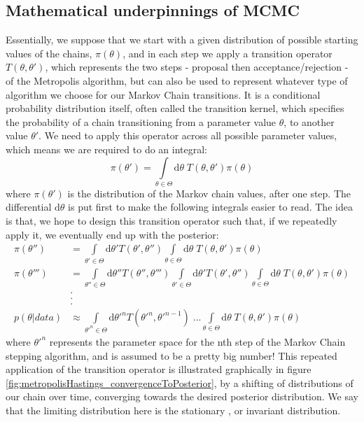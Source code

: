 \documentclass[11pt,fullpage]{book}
\begin{document}
\subsection{Mathematical underpinnings of MCMC}\label{sec:metropolisHastings_mathematicalMCMC}
Essentially, we suppose that we start with a given distribution of possible starting values of the chains, $\pi(\theta)$, and in each step we apply a transition operator $T(\theta,\theta')$, which represents the two steps - proposal then acceptance/rejection - of the Metropolis algorithm, but can also be used to represent whatever type of algorithm we choose for our Markov Chain transitions\cite{chib1995understanding}. It is a conditional probability distribution itself, often called the transition kernel, which specifies the probability of a chain transitioning from a parameter value $\theta$, to another value $\theta'$. We need to apply this operator across all possible parameter values, which means we are required to do an integral:
%
\begin{equation}
\pi(\theta') = \int\limits_{\theta\in\Theta} \mathrm{d}\theta \; T(\theta,\theta') \pi(\theta) 
\end{equation}
%
where $\pi(\theta')$ is the distribution of the Markov chain values, after one step. The differential $\mathrm{d}\theta$ is put first to make the following integrals easier to read. The idea is that, we hope to design this transition operator such that, if we repeatedly apply it, we eventually end up with the posterior:
%
\begin{align}
\pi(\theta'') &= \int\limits_{\theta'\in\Theta}\mathrm{d}\theta' T(\theta',\theta'') \int\limits_{\theta\in\Theta}\mathrm{d}\theta\; T(\theta,\theta') \pi(\theta)\\
\pi(\theta''') &=  \int\limits_{\theta''\in\Theta}\mathrm{d}\theta'' T(\theta'',\theta''') \int\limits_{\theta'\in\Theta}\mathrm{d}\theta' T(\theta',\theta'') \int\limits_{\theta\in\Theta}\mathrm{d}\theta \; T(\theta,\theta') \pi(\theta)\\ 
&.\\
&.\\
&.\\
p(\theta|data) &\approx  \int\limits_{\theta'^n\in\Theta}\mathrm{d}\theta'^n T(\theta'^n,\theta'^{n-1})\;... \int\limits_{\theta\in\Theta} \mathrm{d}\theta \; T(\theta,\theta') \pi(\theta)
\end{align}
%
where $\theta'^n$ represents the parameter space for the nth step of the Markov Chain stepping algorithm, and is assumed to be a pretty big number! This repeated application of the transition operator is illustrated graphically in figure \ref{fig:metropolisHastings_convergenceToPosterior}, by a shifting of distributions of our chain over time, converging towards the desired posterior distribution. We say that the limiting distribution here is the stationary , or invariant  distribution.
\end{document}

